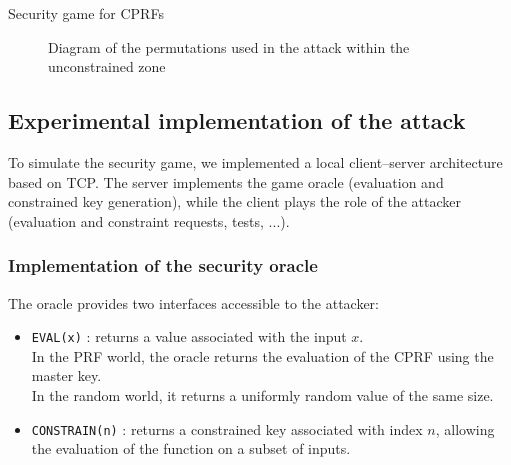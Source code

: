 \documentclass[9pt]{extarticle}
\begin{document}
\begin{defbox}{Security game for CPRFs}
\begin{figure}[H]
\caption{Diagram of the permutations used in the attack within the unconstrained zone}
\end{figure}




\end{defbox}

\subsection{Experimental implementation of the attack}

To simulate the security game, we implemented a local client–server architecture 
based on TCP. The server implements the game oracle 
(evaluation and constrained key generation), 
while the client plays the role of the attacker (evaluation and constraint requests, tests, ...).


\subsubsection{Implementation of the security oracle}


The oracle provides two interfaces accessible to the attacker:
\begin{itemize}
    \item \texttt{EVAL(x)} : returns a value associated with the input $x$.\\
    In the PRF world, the oracle returns the evaluation of the CPRF using the master key.\\
    In the random world, it returns a uniformly random value of the same size.

    \item \texttt{CONSTRAIN(n)} : returns a constrained key associated with index $n$,
    allowing the evaluation of the function on a subset of inputs.
\end{itemize}
\end{document}
